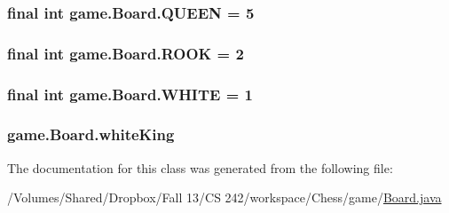 \hypertarget{classgame_1_1_board_a010790144c6c1e42d97ce588d1522184}{
\subsubsection[{Q\-U\-E\-E\-N}]{\setlength{\rightskip}{0pt plus 5cm}final int game.\-Board.\-Q\-U\-E\-E\-N = 5\hspace{0.3cm}{\ttfamily [static]}}}\label{classgame_1_1_board_a010790144c6c1e42d97ce588d1522184}
\hypertarget{classgame_1_1_board_a6e93b6ff58a5e29c8067eaf569acd7d1}{
\subsubsection[{R\-O\-O\-K}]{\setlength{\rightskip}{0pt plus 5cm}final int game.\-Board.\-R\-O\-O\-K = 2\hspace{0.3cm}{\ttfamily [static]}}}\label{classgame_1_1_board_a6e93b6ff58a5e29c8067eaf569acd7d1}
\hypertarget{classgame_1_1_board_ad3b4223ca4e14051a8bdd78a95b38071}{
\subsubsection[{W\-H\-I\-T\-E}]{\setlength{\rightskip}{0pt plus 5cm}final int game.\-Board.\-W\-H\-I\-T\-E = 1\hspace{0.3cm}{\ttfamily [static]}}}\label{classgame_1_1_board_ad3b4223ca4e14051a8bdd78a95b38071}
\hypertarget{classgame_1_1_board_ae468c82687902428871a19693c923c15}{
\subsubsection[{white\-King}]{ game.\-Board.\-white\-King}}\label{classgame_1_1_board_ae468c82687902428871a19693c923c15}


The documentation for this class was generated from the following file\-:\begin{DoxyCompactItemize}
\item 
/\-Volumes/\-Shared/\-Dropbox/\-Fall 13/\-C\-S 242/workspace/\-Chess/game/\hyperlink{_board_8java}{Board.\-java}\end{DoxyCompactItemize}
